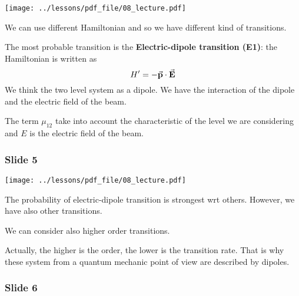 \documentclass[../main/main.tex]{subfiles}
\begin{document}
\begin{minipage}[]{0.5\linewidth}
\centering
\texttt{[image: ../lessons/pdf\_file/08\_lecture.pdf]}
\end{minipage}
\hspace{0.3cm}
\vspace{0.3cm}
\begin{minipage}[c]{0.47\linewidth}

We can use different Hamiltonian and so we have different kind of transitions.

The most probable transition is the \textbf{Electric-dipole transition (E1)}: the Hamiltonian is written as
\begin{equation*}
  H' = - \va{p} \cdot \va{E}
\end{equation*}
We think the two level system as a dipole. We have the interaction of the dipole and the electric field of the beam.

The term \( \mu_{12}  \) take into account the characteristic of the level we are considering and \( E \) is the electric field of the beam.

\end{minipage}

\subsubsection*{Slide 5}

\begin{minipage}[]{0.5\linewidth}
\centering
\texttt{[image: ../lessons/pdf\_file/08\_lecture.pdf]}
\end{minipage}
\hspace{0.3cm}
\vspace{0.3cm}
\begin{minipage}[c]{0.47\linewidth}

The probability of electric-dipole transition is strongest wrt others. However, we have also other transitions.

We can consider also higher order transitions.

Actually, the higher is the order, the lower is the transition rate. That is why these system from a quantum mechanic point of view are described by dipoles.


\end{minipage}

\subsubsection*{Slide 6}
\end{document}
